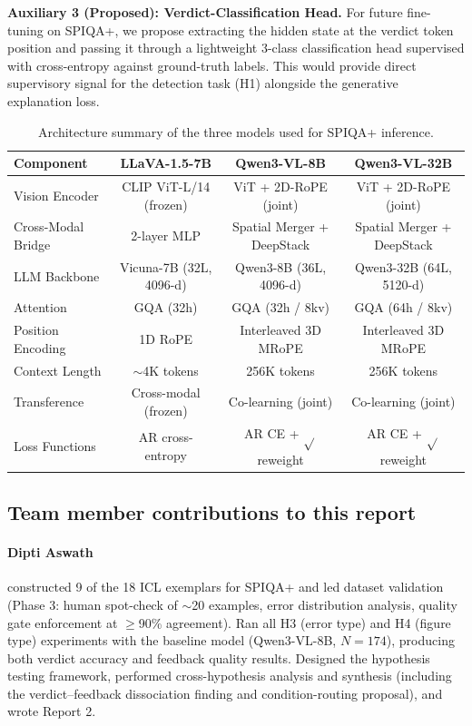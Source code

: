 \documentclass{article} %
\begin{document}
\textbf{Auxiliary 3 (Proposed): Verdict-Classification Head.} For future fine-tuning on SPIQA+, we propose extracting the hidden state at the verdict token position and passing it through a lightweight 3-class classification head supervised with cross-entropy against ground-truth labels. This would provide direct supervisory signal for the detection task (H1) alongside the generative explanation loss.

\begin{table}[t]
\centering
\caption{Architecture summary of the three models used for SPIQA+ inference.}
\label{tab:arch-summary}
\small
\begin{tabular}{@{}lccc@{}}
\toprule
\textbf{Component} & \textbf{LLaVA-1.5-7B} & \textbf{Qwen3-VL-8B} & \textbf{Qwen3-VL-32B} \\
\midrule
Vision Encoder & CLIP ViT-L/14 (frozen) & ViT + 2D-RoPE (joint) & ViT + 2D-RoPE (joint) \\
Cross-Modal Bridge & 2-layer MLP & Spatial Merger + DeepStack & Spatial Merger + DeepStack \\
LLM Backbone & Vicuna-7B (32L, 4096-d) & Qwen3-8B (36L, 4096-d) & Qwen3-32B (64L, 5120-d) \\
Attention & GQA (32h) & GQA (32h / 8kv) & GQA (64h / 8kv) \\
Position Encoding & 1D RoPE & Interleaved 3D MRoPE & Interleaved 3D MRoPE \\
Context Length & ${\sim}$4K tokens & 256K tokens & 256K tokens \\
Transference & Cross-modal (frozen) & Co-learning (joint) & Co-learning (joint) \\
Loss Functions & AR cross-entropy & AR CE + $\sqrt{}$ reweight & AR CE + $\sqrt{}$ reweight \\
\bottomrule
\end{tabular}
\end{table}


\clearpage
\subsection{Team member contributions to this report}

\paragraph{Dipti Aswath} constructed 9 of the 18 ICL exemplars for SPIQA+ and led dataset validation (Phase 3: human spot-check of ${\sim}$20 examples, error distribution analysis, quality gate enforcement at $\geq$90\% agreement). Ran all H3 (error type) and H4 (figure type) experiments with the baseline model (Qwen3-VL-8B, $N{=}174$), producing both verdict accuracy and feedback quality results. Designed the hypothesis testing framework, performed cross-hypothesis analysis and synthesis (including the verdict--feedback dissociation finding and condition-routing proposal), and wrote Report 2.
\end{document}
